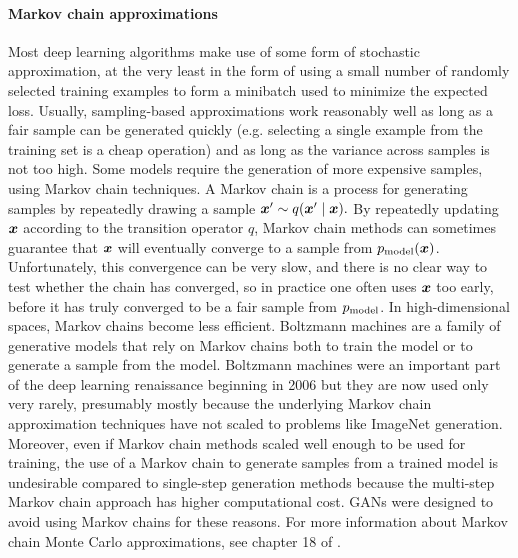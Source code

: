 \paragraph{Markov chain approximations}
Most deep learning algorithms make use of some form of stochastic approximation,
at the very least in the form of using a small number of randomly selected training
examples to form a minibatch used to minimize the expected loss.
Usually, sampling-based approximations work reasonably well as long as a fair sample
can be generated quickly (e.g. selecting a single example from the training set
is a cheap operation) and as long as the variance across samples is not too high.
Some models require the generation of more expensive samples, using Markov chain
techniques.
A Markov chain is a process for generating samples by repeatedly drawing a sample
${\bm{x}}' \sim q({\bm{x}}' \mid {\bm{x}}).$
By repeatedly updating ${\bm{x}}$ according to the transition operator $q$, Markov chain
methods can sometimes guarantee that ${\bm{x}}$ will eventually converge to a sample from
$p_{\rm{model}}({\bm{x}})$.
Unfortunately, this convergence can be very slow, and there is no clear way to test
whether the chain has converged, so in practice one often uses ${\bm{x}}$ too early, before
it has truly converged to be a fair sample from $p_{\rm{model}}$.
In high-dimensional spaces, Markov chains become less efficient.
Boltzmann machines \citep{Fahlman83,Ackley85,Hinton-Boltzmann,Hinton86a} are a
family of generative models that rely on Markov chains both to train the model
or to generate a sample from the model.
Boltzmann machines were an important part of the deep learning renaissance beginning
in 2006 \citep{Hinton06,hinton2007learning} but they are now used only very rarely,
presumably mostly because the underlying Markov chain approximation techniques have
not scaled to problems like ImageNet generation.
Moreover, even if Markov chain methods scaled well enough to be used for training,
the use of a Markov chain to generate samples from a trained model is undesirable
compared to single-step generation methods because the multi-step Markov chain
approach has higher computational cost.
GANs were designed to avoid using Markov chains for these reasons.
For more information about Markov chain Monte Carlo approximations, see chapter 18 of
\citet{Goodfellow-et-al-2016}.


